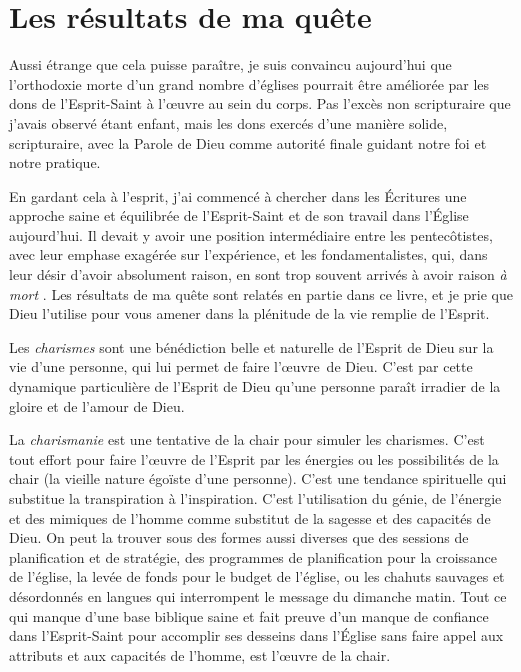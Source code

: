 \section{Les r\'esultats de ma qu\^ete}

Aussi étrange que cela puisse paraître, je suis convaincu aujour\-d'hui que
 l'orthodoxie morte d'un grand nombre d'églises pourrait être améliorée par les
 dons de l'Esprit-Saint à l'œuvre au sein du corps. Pas l'excès non scripturaire que
 j'avais observé étant enfant, mais les dons exercés d'une manière solide,
 scripturaire, avec la Parole de Dieu comme autorité finale guidant notre foi et
 notre pratique.

En gardant cela à l'esprit, j'ai commencé à chercher dans les Écritures une
 approche saine et équilibrée de l'Esprit-Saint et de son travail dans l'Église
 aujourd'hui. Il devait y avoir une position inter\-mé\-di\-aire entre les
 pentecôtistes, avec leur emphase exagérée sur l'ex\-pé\-rience, et les
 fondamentalistes, qui, dans leur désir d'avoir absolument raison,
 en sont trop souvent arrivés à avoir raison \emph{à mort}
 .
 Les résultats de ma quête sont relatés en partie dans ce livre, et je prie que
 Dieu l'utilise pour vous amener dans la plénitude de la vie remplie de
 l'Esprit.

Les \emph{charismes} sont une bénédiction belle et naturelle de l'Esprit de Dieu
 sur la vie d'une personne, qui lui permet de faire l'œuvre~de Dieu. C'est par
 cette dynamique particulière de l'Esprit de Dieu qu'une personne paraît irradier de
 la gloire et de l'amour de Dieu.

La \emph{charismanie} est une tentative de la chair pour simuler les charismes.
 C'est tout effort pour faire l'œuvre de l'Esprit par les énergies ou les
 possibilités de la chair (la vieille nature égoïste d'une personne). C'est
 une tendance spirituelle qui substitue la transpiration à l'inspiration. C'est
 l'utilisation du génie, de l'énergie et des mimiques de l'homme comme substitut
 de la sagesse et des capacités de Dieu. On peut la trouver sous des formes
 aussi diverses que des sessions de planification et de stratégie, des
 programmes de planification pour la croissance de l'église, la levée de fonds
 pour le budget de l'église, ou les chahuts sauvages et désordonnés en langues
 qui interrompent le message du dimanche matin. Tout ce qui manque d'une base
 biblique saine et fait preuve d'un manque de confiance dans l'Esprit-Saint pour
 accomplir ses desseins dans l'Église sans faire appel aux attributs
 et aux capacités de l'homme, est l'œuvre de la chair.

